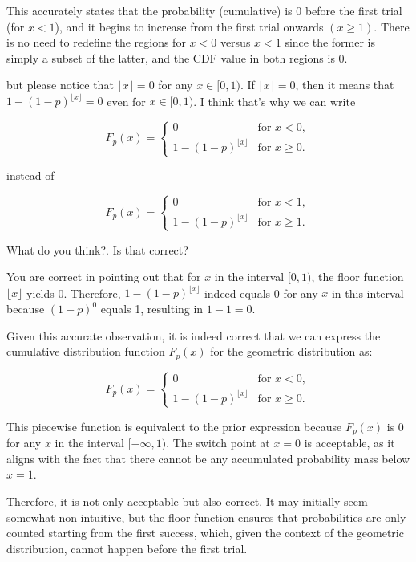 \documentclass[12pt]{article}
\begin{document}
This accurately states that the probability (cumulative) is 0 before the first trial (for \( x < 1 \)), and it begins to increase from the first trial onwards \( (x \geq 1) \). There is no need to redefine the regions for \( x < 0 \) versus \( x < 1 \) since the former is simply a subset of the latter, and the CDF value in both regions is 0.

\newpage

but please notice that $\lfloor x \rfloor=0$ for any $x \in [0,1)$. If $\lfloor x \rfloor=0$, then it means that $1 - (1 - p)^{\lfloor x \rfloor}=0 $ even for $x \in [0,1)$. I think that's why we can write 

\[
F_p(x) = 
\begin{cases}
0 & \text{for } x < 0, \\
1 - (1 - p)^{\lfloor x \rfloor} & \text{for } x \geq 0.
\end{cases}
\]

instead of 


\[
F_p(x) =
\begin{cases}
0 & \text{for } x < 1, \\
1 - (1 - p)^{\lfloor x \rfloor} & \text{for } x \geq 1.
\end{cases}
\]

What do you think?. Is that correct?

\newpage

You are correct in pointing out that for \( x \) in the interval \([0,1)\), the floor function \( \lfloor x \rfloor \) yields 0. Therefore, \( 1 - (1 - p)^{\lfloor x \rfloor} \) indeed equals 0 for any \( x \) in this interval because \( (1 - p)^0 \) equals 1, resulting in \( 1 - 1 = 0 \).

Given this accurate observation, it is indeed correct that we can express the cumulative distribution function \( F_p(x) \) for the geometric distribution as:

\[
F_p(x) = 
\begin{cases}
0 & \text{for } x < 0, \\
1 - (1 - p)^{\lfloor x \rfloor} & \text{for } x \geq 0.
\end{cases}
\]

This piecewise function is equivalent to the prior expression because \( F_p(x) \) is 0 for any \( x \) in the interval \([- \infty, 1)\). The switch point at \( x = 0 \) is acceptable, as it aligns with the fact that there cannot be any accumulated probability mass below \( x = 1 \).

Therefore, it is not only acceptable but also correct. It may initially seem somewhat non-intuitive, but the floor function ensures that probabilities are only counted starting from the first success, which, given the context of the geometric distribution, cannot happen before the first trial.
\end{document}
